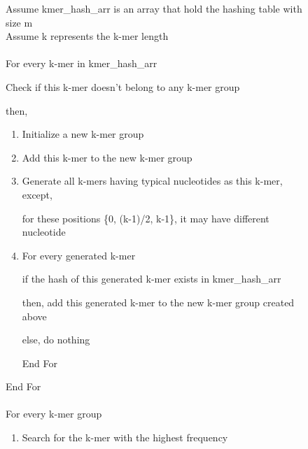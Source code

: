 \documentclass[12pt,openany]{llncs}
\begin{document}
\begin{figure}
\vspace{0.1cm}
\begin{bordered}
Assume kmer\_hash\_arr is an array that hold the hashing table with size m
\\
Assume k represents the k-mer length
\\
\\
For every k-mer in kmer\_hash\_arr

\noindent\hspace{0.4cm} Check if this k-mer doesn't belong to any k-mer group

\noindent\hspace{0.4cm} then,

\vspace{-3mm}
\begin{enumerate}
\addtolength{\itemindent}{1cm}
	  \item Initialize a new k-mer group

	  \item Add this k-mer to the new k-mer group

      \item Generate all k-mers having typical nucleotides as this k-mer, except,
      
      \noindent\hspace{1cm} for these positions \{0, (k-1)/2, k-1\}, it may have different nucleotide
      
      \item For every generated k-mer
	
		\noindent\hspace{1.4cm} if the hash of this generated k-mer exists in kmer\_hash\_arr 
		
		\noindent\hspace{1.4cm} then, add this generated k-mer to the new k-mer group created above
		
		\noindent\hspace{1.4cm} else, do nothing
		
		\noindent\hspace{1cm} End For
		
\end{enumerate}            
\vspace{-3mm}

End For
\\
\\
For every k-mer group 

\vspace{-3mm}
\begin{enumerate}
\addtolength{\itemindent}{1cm}
  \item Search for the k-mer with the highest frequency 


\end{enumerate}
\end{bordered}
\end{figure}
\end{document}
